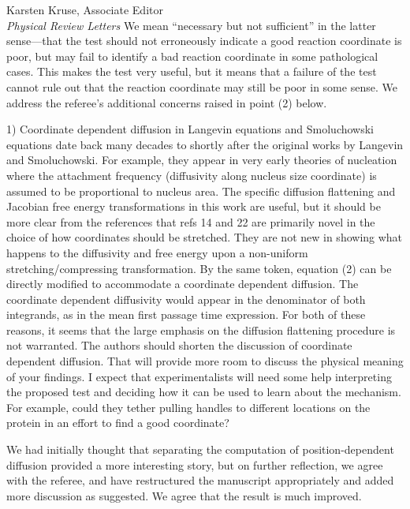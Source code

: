 \documentclass[ucb,qb3,10pt,fullfrom]{ucletter}
\begin{document}
\begin{letter}{Karsten Kruse, Associate Editor\\
\emph{Physical Review Letters}}
\color{black}
We mean ``necessary but not sufficient'' in the latter sense---that the test should not erroneously indicate a good reaction coordinate is poor, but may fail to identify a bad reaction coordinate in some pathological cases.
This makes the test very useful, but it means that a failure of the test cannot rule out that the reaction coordinate may still be poor in some sense.
We address the referee's additional concerns raised in point (2) below.

\color{magenta}
1) Coordinate dependent diffusion in Langevin equations and
Smoluchowski equations date back many decades to shortly after the
original works by Langevin and Smoluchowski. For example, they appear
in very early theories of nucleation where the attachment frequency
(diffusivity along nucleus size coordinate) is assumed to be
proportional to nucleus area. The specific diffusion flattening and
Jacobian free energy transformations in this work are useful, but it
should be more clear from the references that refs 14 and 22 are
primarily novel in the choice of how coordinates should be stretched.
They are not new in showing what happens to the diffusivity and free
energy upon a non-uniform stretching/compressing transformation. By
the same token, equation (2) can be directly modified to accommodate a
coordinate dependent diffusion. The coordinate dependent diffusivity
would appear in the denominator of both integrands, as in the mean
first passage time expression. For both of these reasons, it seems
that the large emphasis on the diffusion flattening procedure is not
warranted. The authors should shorten the discussion of coordinate
dependent diffusion. That will provide more room to discuss the
physical meaning of your findings. I expect that experimentalists will
need some help interpreting the proposed test and deciding how it can
be used to learn about the mechanism. For example, could they tether
pulling handles to different locations on the protein in an effort to
find a good coordinate?

\color{black}
We had initially thought that separating the computation of position-dependent diffusion provided a more interesting story, but on further reflection, we agree with the referee, and have restructured the manuscript appropriately and added more discussion as suggested.
We agree that the result is much improved.


\end{letter}
\end{document}
